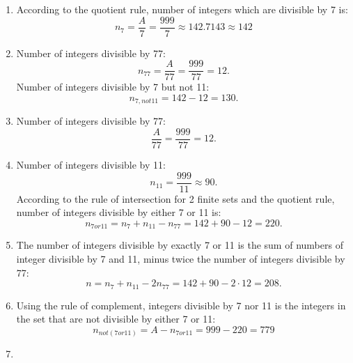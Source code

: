 \documentclass[a4paper]{article}
\begin{document}
	\begin{enumerate}[label = \textbf{\alph*)}]
	    \item According to the quotient rule, number of integers which are divisible by 7 is:
	    \begin{equation*}
	        n_7 = \frac{A}{7} = \frac{999}{7} \approx 142.7143 \approx 142
	    \end{equation*}
        \item Number of integers divisible by 77:
	    \begin{equation*}
	        n_{77} = \frac{A}{77} = \frac{999}{77} = 12. 
	    \end{equation*}
	    Number of integers divisible by 7 but not 11:
	    \begin{equation*}
	        n_{7,not 11} = 142 - 12 = 130.
	    \end{equation*}
        \item Number of integers divisible by 77:
	    \begin{equation*}
	        \frac{A}{77} = \frac{999}{77} = 12. 
	    \end{equation*}
        \item Number of integers divisible by 11:
        \begin{equation*}
            n_{11} = \frac{999}{11} \approx 90.
        \end{equation*}
        According to the rule of intersection for 2 finite sets and the quotient rule, number of integers divisible by either 7 or 11 is:
	    \begin{equation*}
	        n_{7 or 11} = n_7 +n_{11} - n_{77} = 142 + 90 - 12 = 220. 
	    \end{equation*}
        \item The number of integers divisible by exactly 7 or 11 is the sum of numbers of integer divisible by 7 and 11, minus twice the number of integers divisible by 77:
        \begin{equation*}
            n = n_7 + n_{11} - 2n_{77} = 142 + 90 - 2\cdot 12 = 208.
        \end{equation*}
        \item Using the rule of complement, integers divisible by 7 nor 11 is the integers in the set that are not divisible by either 7 or 11:
        \begin{equation*}
            n_{not(7 or 11)} = A - n_{7 or 11} = 999 - 220 = 779
        \end{equation*}
        \item 

\end{enumerate}
\end{document}
